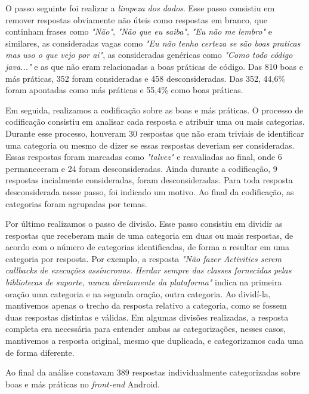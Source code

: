 O passo seguinte foi realizar a \textit{limpeza dos dados}. Esse passo consistiu em remover respostas obviamente n\~ao \'uteis como respostas em branco, que continham frases como \textit{"N\~ao"}, \textit{"N\~ao que eu saiba"}, \textit{"Eu n\~ao me lembro"} e similares, as consideradas vagas como \textit{"Eu n\~ao tenho certeza se s\~ao boas praticas mas uso o que vejo por ai"}, as consideradas gen\'ericas como \textit{"Como todo c\'odigo java..."} e as que n\~ao eram relacionadas a boas pr\'aticas de c\'odigo. Das 810 boas e m\'as pr\'aticas, 352 foram consideradas e 458 desconsideradas. Das 352, 44,6\% foram apontadas como m\'as pr\'aticas e 55,4\% como boas pr\'aticas. 


Em seguida, realizamos a codifica\c{c}\~ao sobre as boas e m\'as pr\'aticas. O processo de codifica\c{c}\~ao consistiu em analisar cada resposta e atribuir uma ou mais categorias. Durante esse processo, houveram 30 respostas que n\~ao eram triviais de identificar uma categoria ou mesmo de dizer se essas respostas deveriam ser consideradas. Essas respostas foram marcadas como \textit{"talvez"} e reavaliadas ao final, onde 6 permaneceram e 24 foram desconsideradas. Ainda durante a codifica\c{c}\~ao, 9 respostas incialmente consideradas, foram desconsideradas. Para toda resposta desconsiderada nesse passo, foi indicado um motivo. Ao final da codifica\c{c}\~ao, as categorias foram agrupadas por temas.

Por \'ultimo realizamos o passo de divis\~ao. Esse passo consistiu em dividir as respostas que receberam mais de uma categoria em duas ou mais respostas, de acordo com o n\'umero de categorias identificadas, de forma a resultar em uma categoria por resposta. Por exemplo, a resposta \textit{"N\~ao fazer Activities serem callbacks de execu\c{c}\~oes ass\'incronas. Herdar sempre das classes fornecidas pelas bibliotecas de suporte, nunca diretamente da plataforma"} indica na primeira ora\c{c}\~ao uma categoria e na segunda ora\c{c}\~ao, outra categoria. Ao divid\'i-la, mantivemos apenas o trecho da resposta relativo a categoria, como se fossem duas respostas distintas e v\'alidas. Em algumas divis\~oes realizadas, a resposta completa era necess\'aria para entender ambas as categoriza\c{c}\~oes, nesses casos, mantivemos a resposta original, mesmo que duplicada, e categorizamos cada uma de forma diferente. 

Ao final da an\'alise constavam 389 respostas individualmente categorizadas sobre boas e m\'as pr\'aticas no \textit{front-end} Android.